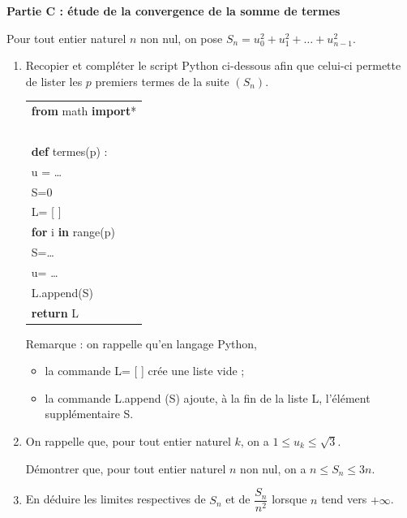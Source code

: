 \documentclass[10pt]{article}
\begin{document}
\medskip

\textbf{Partie C : étude de la convergence de la somme de termes}

\medskip

Pour tout entier naturel $n$ non nul, on pose $S_n = u_0^2 + u_1^2 + \ldots + u_{n-1}^2$.

\medskip

\begin{enumerate}
\item Recopier et compléter le script Python ci-dessous afin que celui-ci permette de lister
les $p$ premiers termes de la suite $(S_n)$.

\begin{center}
\begin{ttfamily}
\begin{tabular}{|l|}\hline
\textbf{from} math \textbf{import}*\\
~\\
\textbf{def} termes(p) :\\
\qquad  u = \ldots\\
\qquad  S=0\\
\qquad  L= [ ]\\
\qquad  \textbf{for} i \textbf{in} range(p)\\
\qquad \qquad S=\ldots\\
\qquad \qquad u= \ldots\\
\qquad \qquad L.append(S) \\
\qquad \textbf{return} L\\ \hline
\end{tabular}
\end{ttfamily}
\end{center}

Remarque : on rappelle qu'en langage Python,

\begin{itemize}[label=$\bullet~$]
\item la commande L= [ ] crée une liste vide ;
\item la commande L.append (S) ajoute, à la fin de la liste L, l'élément supplémentaire S.
\end{itemize}

\item On rappelle que, pour tout entier naturel $k$, on a $1 \leqslant u_k \leqslant \sqrt 3$.

Démontrer que, pour tout entier naturel $n$ non nul, on a $n \leqslant S_n \leqslant 3n$.
\item En déduire les limites respectives de $S_n$ et de $\dfrac{S_n}{n^2}$ lorsque $n$ tend vers $+ \infty$.
\end{enumerate}

\medskip
\end{document}
